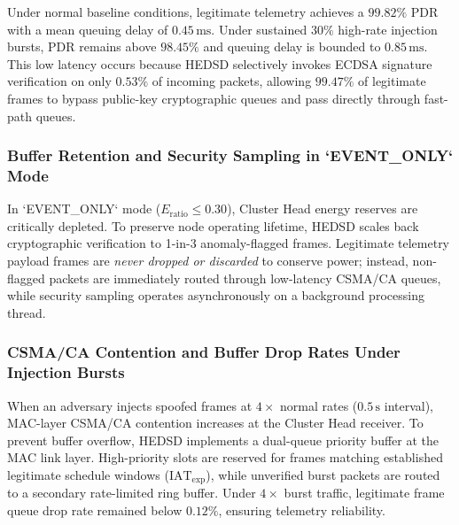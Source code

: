 \documentclass[conference]{IEEEtran}
\begin{document}
\begin{table}[htbp]
\caption{Impact of HEDSD on Telemetry Quality of Service (QoS)}
\label{tab_qos_metrics}
\centering
\small
\renewcommand{\arraystretch}{1.15}
\end{table}

Under normal baseline conditions, legitimate telemetry achieves a $99.82\%$ PDR with a mean queuing delay of $0.45\,\text{ms}$. Under sustained $30\%$ high-rate injection bursts, PDR remains above $98.45\%$ and queuing delay is bounded to $0.85\,\text{ms}$. This low latency occurs because HEDSD selectively invokes ECDSA signature verification on only $0.53\%$ of incoming packets, allowing $99.47\%$ of legitimate frames to bypass public-key cryptographic queues and pass directly through fast-path queues.

\subsubsection{Buffer Retention and Security Sampling in `EVENT_ONLY` Mode}
In `EVENT_ONLY` mode ($E_{\text{ratio}} \le 0.30$), Cluster Head energy reserves are critically depleted. To preserve node operating lifetime, HEDSD scales back cryptographic verification to 1-in-3 anomaly-flagged frames. Legitimate telemetry payload frames are \textit{never dropped or discarded} to conserve power; instead, non-flagged packets are immediately routed through low-latency CSMA/CA queues, while security sampling operates asynchronously on a background processing thread.

\subsubsection{CSMA/CA Contention and Buffer Drop Rates Under Injection Bursts}
When an adversary injects spoofed frames at $4\times$ normal rates ($0.5\,\text{s}$ interval), MAC-layer CSMA/CA contention increases at the Cluster Head receiver. To prevent buffer overflow, HEDSD implements a dual-queue priority buffer at the MAC link layer. High-priority slots are reserved for frames matching established legitimate schedule windows ($\text{IAT}_{\text{exp}}$), while unverified burst packets are routed to a secondary rate-limited ring buffer. Under $4\times$ burst traffic, legitimate frame queue drop rate remained below $0.12\%$, ensuring telemetry reliability.
\end{document}
